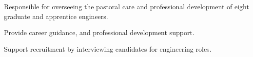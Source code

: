 \sectionsep{}
Responsible for overseeing the pastoral care and professional development of eight graduate and apprentice engineers.
\vspace{0.25em}
\begin{tightemize}
  \item Provide career guidance, and professional development support.
  \item Support recruitment by interviewing candidates for engineering roles.
\end{tightemize}
\sectionsep{}
